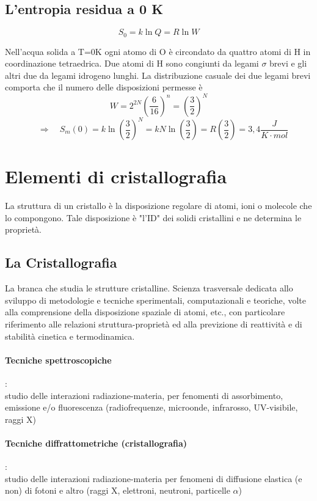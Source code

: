 \documentclass{article}
\newcommand{\So}{\quad \Rightarrow \quad}
\begin{document}
\subsection{L'entropia residua a 0 K}
\begin{equation*}
    S_0=k\ln Q=R\ln W
\end{equation*}

Nell'acqua solida a T=0K ogni atomo di O è circondato da quattro atomi di H in coordinazione tetraedrica. Due atomi di H sono congiunti da legami $\sigma$ brevi e gli altri due da legami idrogeno lunghi. La distribuzione casuale dei due legami brevi comporta che il numero delle disposizioni permesse è
\begin{equation*}
    W=2^{2N}(\frac{6}{16})^n=(\frac{3}{2})^N
\end{equation*}
\begin{equation*}
    \So S_m(0)=k\ln (\frac{3}{2})^N=kN\ln (\frac{3}{2})=R(\frac{3}{2})=3,4\frac{J}{K \cdot mol}
\end{equation*}

\newpage

\section{Elementi di cristallografia}
La struttura di un cristallo è la disposizione regolare di atomi, ioni o molecole che lo compongono. Tale disposizione è "l'ID" dei solidi cristallini e ne determina le proprietà. \\
\subsection{La Cristallografia}La branca che studia le strutture cristalline. Scienza trasversale dedicata allo sviluppo di metodologie e tecniche sperimentali, computazionali e teoriche, volte alla comprensione della disposizione spaziale di atomi, etc., con particolare riferimento alle relazioni struttura-proprietà ed alla previzione di reattività e di stabilità cinetica e termodinamica. 
\paragraph{Tecniche spettroscopiche}:\\
studio delle interazioni radiazione-materia, per fenomenti di assorbimento, emissione e/o fluorescenza (radiofrequenze, microonde, infrarosso, UV-visibile, raggi X)
\paragraph{Tecniche diffrattometriche (cristallografia)}: \\
studio delle interazioni radiazione-materia per fenomeni di diffusione elastica (e non) di fotoni e altro (raggi X, elettroni, neutroni, particelle $\alpha$)
\end{document}
